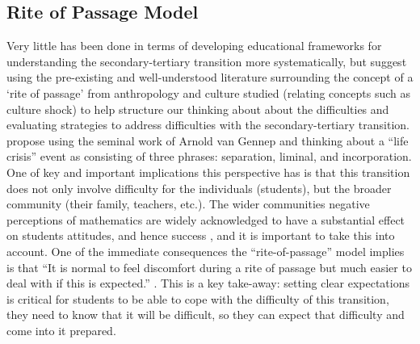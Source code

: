 \documentclass[twoside,12pt,a4paper]{report}
\begin{document}
\subsection*{Rite of Passage Model}

Very little has been done in terms of developing educational frameworks for understanding the secondary-tertiary transition more systematically, but  suggest using the pre-existing and well-understood literature surrounding the concept of a `rite of passage' from anthropology and culture studied (relating concepts such as culture shock) to help structure our thinking about about the difficulties and evaluating strategies to address difficulties with the secondary-tertiary transition.  propose using the seminal work of Arnold van Gennep and thinking about a ``life crisis'' event as consisting of three phrases: separation, liminal, and incorporation. One of key and important implications this perspective has is that this transition does not only involve difficulty for the individuals (students), but the broader community (their family, teachers, etc.). The wider communities negative perceptions of mathematics are widely acknowledged to have a substantial effect on students attitudes, and hence success \cite{King2015, Gordon2013}, and it is important to take this into account. One of the immediate consequences the ``rite-of-passage'' model implies is that ``It is normal to feel
discomfort during a rite of passage but much easier to deal with if this is expected.'' \cite{Clark2008}. This is a key take-away: setting clear expectations is critical for students to be able to cope with the difficulty of this transition, they need to know that it will be difficult, so they can expect that difficulty and come into it prepared. 

\end{document}
